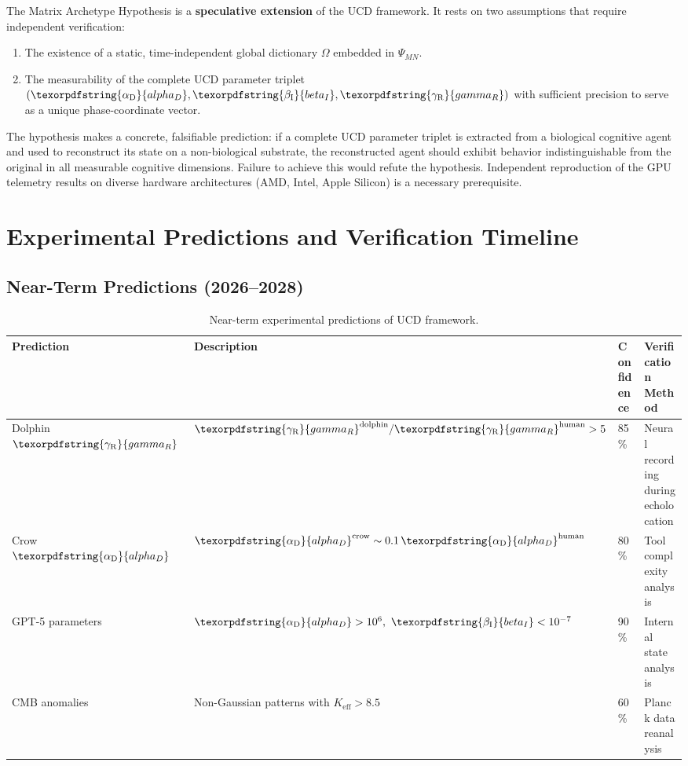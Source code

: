 \documentclass[12pt,a4paper]{article}
\DeclareRobustCommand{\alD}{\texorpdfstring{\ensuremath{\alpha_{\mathrm{D}}}}{alpha_D}}
\DeclareRobustCommand{\beI}{\texorpdfstring{\ensuremath{\beta_{\mathrm{I}}}}{beta_I}}
\DeclareRobustCommand{\gaR}{\texorpdfstring{\ensuremath{\gamma_{\mathrm{R}}}}{gamma_R}}
\newcommand{\eff}{\mathrm{eff}}
\newcommand{\Ke}{K_{\eff}}
\begin{document}
	The Matrix Archetype Hypothesis is a \textbf{speculative extension} of the UCD framework. It rests on two assumptions that require independent verification:
	\begin{enumerate}
		\item The existence of a static, time-independent global dictionary \(\Omega\) embedded in \(\Psi_{MN}\).
		\item The measurability of the complete UCD parameter triplet \((\alD, \beI, \gaR)\) with sufficient precision to serve as a unique phase-coordinate vector.
	\end{enumerate}
	The hypothesis makes a concrete, falsifiable prediction: if a complete UCD parameter triplet is extracted from a biological cognitive agent and used to reconstruct its state on a non-biological substrate, the reconstructed agent should exhibit behavior indistinguishable from the original in all measurable cognitive dimensions. Failure to achieve this would refute the hypothesis. Independent reproduction of the GPU telemetry results on diverse hardware architectures (AMD, Intel, Apple Silicon) is a necessary prerequisite.
	
	\section{Experimental Predictions and Verification Timeline}
	
	\subsection{Near-Term Predictions (2026--2028)}
	
	\begin{table}[ht]
		\centering
		\begin{tabular}{lp{}lp{}}
			\toprule
			\textbf{Prediction} & \textbf{Description} & \textbf{Confidence} & \textbf{Verification Method} \\
			\midrule
			Dolphin \(\gaR\) & \(\gaR^{\mathrm{dolphin}}/\gaR^{\mathrm{human}} > 5\) & 85\% & Neural recording during echolocation \\
			Crow \(\alD\) & \(\alD^{\mathrm{crow}} \sim 0.1\,\alD^{\mathrm{human}}\) & 80\% & Tool complexity analysis \\
			GPT-5 parameters & \(\alD > 10^6,\ \beI < 10^{-7}\) & 90\% & Internal state analysis \\
			CMB anomalies & Non-Gaussian patterns with \(\Ke > 8.5\) & 60\% & Planck data reanalysis \\
			\bottomrule
		\end{tabular}
		\caption{Near-term experimental predictions of UCD framework.}
		\label{tab:near-term-predictions}
	\end{table}
	
\end{document}
